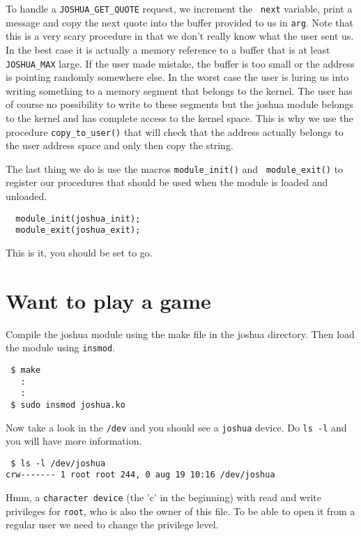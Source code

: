 \documentclass[a4paper,11pt]{article}
\begin{document}
To handle a {\tt JOSHUA\_GET\_QUOTE} request, we increment the {\tt
  next} variable, print a message and copy the next quote into the
buffer provided to us in {\tt arg}. Note that this is a very scary
procedure in that we don't really know what the user sent us. In the
best case it is actually a memory reference to a buffer that is at
least {\tt JOSHUA\_MAX} large. If the user made mistake, the buffer is
too small or the address is pointing randomly somewhere else. In the
worst case the user is luring us into writing something to a memory
segment that belongs to the kernel. The user has of course no
possibility to write to these segments but the joshua module belongs
to the kernel and has complete access to the kernel space. This is why
we use the procedure {\tt copy\_to\_user()} that will check that the
address actually belongs to the user address space and only then copy
the string.

The last thing we do is use the macros {\tt module\_init()} and {\tt
  module\_exit()} to register our procedures that should be used when
the module is loaded and unloaded.

\begin{lstlisting}
  module_init(joshua_init);
  module_exit(joshua_exit);  
\end{lstlisting}

This is it, you should be set to go. 

\section{Want to play a game}

Compile the joshua module using the make file in the joshua
directory. Then load the module using {\tt insmod}.

\begin{verbatim}
 $ make 
   :
   :
 $ sudo insmod joshua.ko
\end{verbatim}

Now take a look in the {\tt /dev} and you should see a {\tt joshua}
device. Do {\tt ls -l} and you will have more information.

\begin{verbatim}
 $ ls -l /dev/joshua
crw------- 1 root root 244, 0 aug 19 10:16 /dev/joshua
\end{verbatim}

Hmm, a {\tt character device} (the 'c' in the beginning) with read and
write privileges for {\tt root}, who is also the owner of this
file. To be able to open it from a regular user we need to change the
privilege level.
\end{document}

